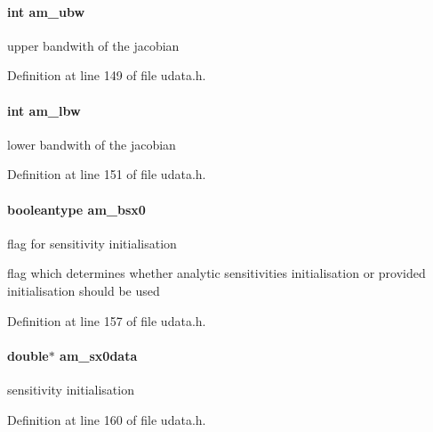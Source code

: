 \paragraph[{am\+\_\+ubw}]{\setlength{\rightskip}{0pt plus 5cm}int am\+\_\+ubw}\label{struct_user_data_a7283826ef630f92bb04052eb79a377e5}
upper bandwith of the jacobian 

Definition at line 149 of file udata.\+h.

\hypertarget{struct_user_data_a0fd271dea83e804c7b1ef82a2b0ab76c}{}
\paragraph[{am\+\_\+lbw}]{\setlength{\rightskip}{0pt plus 5cm}int am\+\_\+lbw}\label{struct_user_data_a0fd271dea83e804c7b1ef82a2b0ab76c}
lower bandwith of the jacobian 

Definition at line 151 of file udata.\+h.

\hypertarget{struct_user_data_a87d2f917b1bea7fea2d5878ccd43c7db}{}
\paragraph[{am\+\_\+bsx0}]{\setlength{\rightskip}{0pt plus 5cm}booleantype am\+\_\+bsx0}\label{struct_user_data_a87d2f917b1bea7fea2d5878ccd43c7db}
flag for sensitivity initialisation

flag which determines whether analytic sensitivities initialisation or provided initialisation should be used 

Definition at line 157 of file udata.\+h.

\hypertarget{struct_user_data_a7ac27602345668b3a2bcabac4c7af733}{}
\paragraph[{am\+\_\+sx0data}]{\setlength{\rightskip}{0pt plus 5cm}double$\ast$ am\+\_\+sx0data}\label{struct_user_data_a7ac27602345668b3a2bcabac4c7af733}
sensitivity initialisation 

Definition at line 160 of file udata.\+h.

\hypertarget{struct_user_data_ace3cae0f78a3365a5fac7d7daa9928ff}{}
